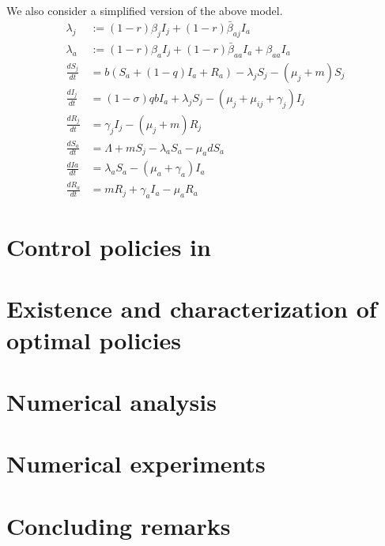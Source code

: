 \documentclass[11pt]{amsart}
\theoremstyle{definition}
\numberwithin{equation}{section}
\begin{document}
We also consider a simplified version of the above model.
    \begin{equation}
        \begin{aligned}
            \lambda_j &:= (1-r) \beta_j I_j + (1-r) \bar{\beta}_{aj} I_a
            \\
            \lambda_a &:= (1-r) \beta_a I_j + (1-r) \bar{\beta}_{aa} I_a
                + \beta_{aa} I_a
        \\
            \frac{d S_j}{dt} &=
            b (S_a + (1 - q) I_a + R_a)
            -\lambda_{j} S_j - (\mu_j + m) S_j 
        \\
            \frac{d I_j}{dt} &=
            (1 - \sigma)  q  b  I_a
            + \lambda_j S_j - (\mu_j + \mu_{ij} + \gamma_j)I_j
        \\
            \frac{d R_j}{dt} &=
            \gamma_j I_j - (\mu_j + m) R_j
        \\
            \frac{dS_a}{dt} &=
            \Lambda + m S_j - \lambda_a S_a - \mu_a dS_a
        \\
            \frac{dIa}{dt} &=
            \lambda_a S_a - (\mu_a + \gamma_a)   I_a
        \\
            \frac{dR_a}{dt} &=
            m R_j + \gamma_a I_a - \mu_a R_a
    \end{aligned}
\end{equation}

    \section{Control policies in }
    \section{Existence and characterization of optimal policies}
    \section{Numerical analysis}
    \section{Numerical experiments}
    \section{Concluding remarks}
%
%  
%  
\end{document}
